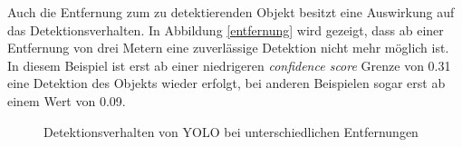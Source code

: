 Auch die Entfernung zum zu detektierenden Objekt besitzt eine Auswirkung auf das Detektionsverhalten. In Abbildung \ref{entfernung} wird gezeigt, dass ab einer Entfernung von drei Metern eine zuverlässige Detektion nicht mehr möglich ist. In diesem Beispiel ist erst ab einer niedrigeren \textit{confidence score} Grenze von 0.31 eine Detektion des Objekts wieder erfolgt, bei anderen Beispielen sogar erst ab einem Wert von 0.09.

\begin{figure}[H]
	\hfill
	\hfill
	\hfill
	\hfill
	\caption{Detektionsverhalten von YOLO bei unterschiedlichen Entfernungen}
	\label{entfernung_yolo}
\end{figure}

